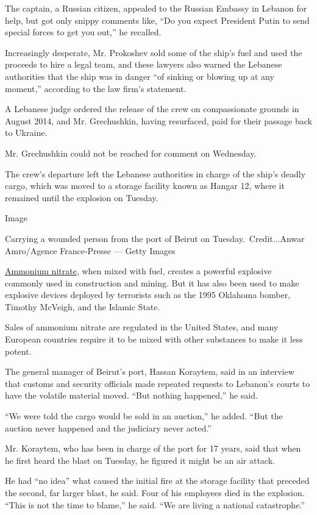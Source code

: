 The captain, a Russian citizen, appealed to the Russian Embassy in
Lebanon for help, but got only snippy comments like, ``Do you expect
President Putin to send special forces to get you out,'' he recalled.

Increasingly desperate, Mr. Prokoshev sold some of the ship's fuel and
used the proceeds to hire a legal team, and these lawyers also warned
the Lebanese authorities that the ship was in danger ``of sinking or
blowing up at any moment,'' according to the law firm's statement.

A Lebanese judge ordered the release of the crew on compassionate
grounds in August 2014, and Mr. Grechushkin, having resurfaced, paid for
their passage back to Ukraine.

Mr. Grechushkin could not be reached for comment on Wednesday.

The crew's departure left the Lebanese authorities in charge of the
ship's deadly cargo, which was moved to a storage facility known as
Hangar 12, where it remained until the explosion on Tuesday.

Image

Carrying a wounded person from the port of Beirut on
Tuesday.~Credit...Anwar Amro/Agence France-Presse --- Getty Images

\href{https://www.nytimes.com/2020/08/05/world/middleeast/beirut-explosion-ammonium-nitrate.html}{Ammonium
nitrate}, when mixed with fuel, creates a powerful explosive commonly
used in construction and mining. But it has also been used to make
explosive devices deployed by terrorists such as the 1995 Oklahoma
bomber, Timothy McVeigh, and the Islamic State.

Sales of ammonium nitrate are regulated in the United States, and many
European countries require it to be mixed with other substances to make
it less potent.

The general manager of Beirut's port, Hassan Koraytem, said in an
interview that customs and security officials made repeated requests to
Lebanon's courts to have the volatile material moved. ``But nothing
happened,'' he said.

``We were told the cargo would be sold in an auction,'' he added. ``But
the auction never happened and the judiciary never acted.''

Mr. Koraytem, who has been in charge of the port for 17 years, said that
when he first heard the blast on Tuesday, he figured it might be an air
attack.

He had ``no idea'' what caused the initial fire at the storage facility
that preceded the second, far larger blast, he said. Four of his
employees died in the explosion. ``This is not the time to blame,'' he
said. ``We are living a national catastrophe.''

